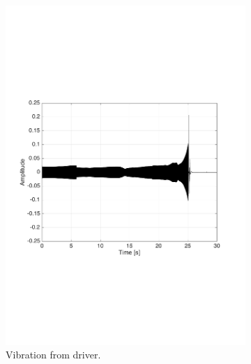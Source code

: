 \begin{figure}[H]
\centering
\begin{subfigure}[t]{0.335\textwidth}
	\includegraphics[width=1\textwidth]{figures/raw_driver20.pdf}
	\caption{Vibration from driver.}
	\label{fig:raw_driver20}
\end{subfigure}
\begin{subfigure}[t]{0.3\textwidth}

\end{subfigure}
\end{figure}
